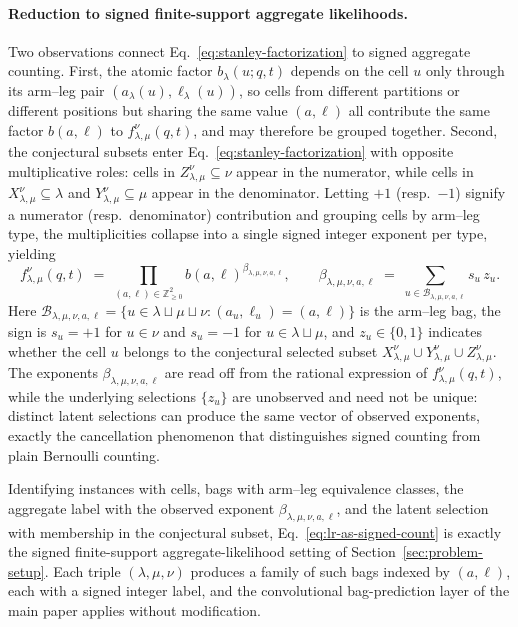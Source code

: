 \paragraph{Reduction to signed finite-support aggregate likelihoods.}
Two observations connect Eq.~\eqref{eq:stanley-factorization} to signed aggregate counting.
First, the atomic factor $b_\lambda(u;q,t)$ depends on the cell $u$ only through its arm--leg pair $(a_\lambda(u),\ell_\lambda(u))$, so cells from different partitions or different positions but sharing the same value $(a,\ell)$ all contribute the same factor $b(a,\ell)$ to $f^\nu_{\lambda,\mu}(q,t)$, and may therefore be grouped together.
Second, the conjectural subsets enter Eq.~\eqref{eq:stanley-factorization} with opposite multiplicative roles: cells in $Z^\nu_{\lambda,\mu}\subseteq\nu$ appear in the numerator, while cells in $X^\nu_{\lambda,\mu}\subseteq\lambda$ and $Y^\nu_{\lambda,\mu}\subseteq\mu$ appear in the denominator.
Letting $+1$ (resp.\ $-1$) signify a numerator (resp.\ denominator) contribution and grouping cells by arm--leg type, the multiplicities collapse into a single signed integer exponent per type, yielding
\begin{equation}
\label{eq:lr-as-signed-count}
f^\nu_{\lambda,\mu}(q,t)
\;=\;
\prod_{(a,\ell)\in\mathbb{Z}_{\ge 0}^{2}} b(a,\ell)^{\beta_{\lambda,\mu,\nu,a,\ell}},
\qquad
\beta_{\lambda,\mu,\nu,a,\ell}
\;=\;
\sum_{u\in\mathcal{B}_{\lambda,\mu,\nu,a,\ell}} s_u\,z_u.
\end{equation}
Here $\mathcal{B}_{\lambda,\mu,\nu,a,\ell}=\{u\in\lambda\sqcup\mu\sqcup\nu : (a_u,\ell_u)=(a,\ell)\}$ is the arm--leg bag, the sign is $s_u=+1$ for $u\in\nu$ and $s_u=-1$ for $u\in\lambda\sqcup\mu$, and $z_u\in\{0,1\}$ indicates whether the cell $u$ belongs to the conjectural selected subset $X^\nu_{\lambda,\mu}\cup Y^\nu_{\lambda,\mu}\cup Z^\nu_{\lambda,\mu}$.
The exponents $\beta_{\lambda,\mu,\nu,a,\ell}$ are read off from the rational expression of $f^\nu_{\lambda,\mu}(q,t)$, while the underlying selections $\{z_u\}$ are unobserved and need not be unique: distinct latent selections can produce the same vector of observed exponents, exactly the cancellation phenomenon that distinguishes signed counting from plain Bernoulli counting.

Identifying instances with cells, bags with arm--leg equivalence classes, the aggregate label with the observed exponent $\beta_{\lambda,\mu,\nu,a,\ell}$, and the latent selection with membership in the conjectural subset, Eq.~\eqref{eq:lr-as-signed-count} is exactly the signed finite-support aggregate-likelihood setting of Section~\ref{sec:problem-setup}.
Each triple $(\lambda,\mu,\nu)$ produces a family of such bags indexed by $(a,\ell)$, each with a signed integer label, and the convolutional bag-prediction layer of the main paper applies without modification.

